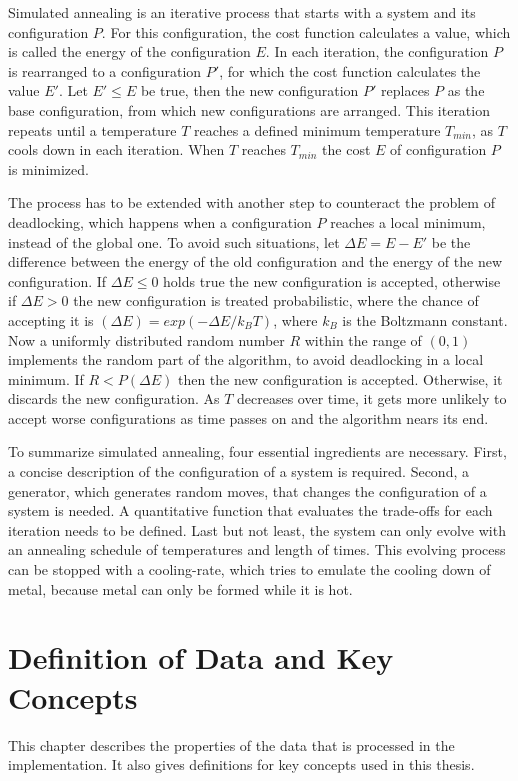 \documentclass[draft,final]{vutinfth} %
\begin{document}
Simulated annealing is an iterative process that starts with a system and its configuration $P$. For this configuration, the cost function calculates a value, which is called the energy of the configuration $E$. In each iteration, the configuration $P$ is rearranged to a configuration $P'$, for which the cost function calculates the value $E'$. Let $E' \leq E$ be true, then the new configuration $P'$ replaces $P$ as the base configuration, from which new configurations are arranged. This iteration repeats until a temperature $T$ reaches a defined minimum temperature $T_{min}$, as $T$ cools down in each iteration. When $T$ reaches $T_{min}$ the cost $E$ of configuration $P$ is minimized.

The process has to be extended with another step to counteract the problem of deadlocking, which happens when a configuration $P$ reaches a local minimum, instead of the global one. To avoid such situations, let $\Delta E = E - E'$ be the difference between the energy of the old configuration and the energy of the new configuration. If $\Delta E \leq 0$ holds true the new configuration is accepted, otherwise if $\Delta E > 0$ the new configuration is treated probabilistic, where the chance of accepting it is $(\Delta E) = exp(-\Delta E / k_B T)$, where $k_B$ is the Boltzmann constant. Now a uniformly distributed random number $R$ within the range of $(0,1)$ implements the random part of the algorithm, to avoid deadlocking in a local minimum. If $R < P(\Delta E)$ then the new configuration is accepted. Otherwise, it discards the new configuration. As $T$ decreases over time, it gets more unlikely to accept worse configurations as time passes on and the algorithm nears its end.

To summarize simulated annealing, four essential ingredients are necessary. First, a concise description of the configuration of a system is required. Second, a generator, which generates random moves, that changes the configuration of a system is needed. A quantitative function that evaluates the trade-offs for each iteration needs to be defined. Last but not least, the system can only evolve with an annealing schedule of temperatures and length of times. This evolving process can be stopped with a cooling-rate, which tries to emulate the cooling down of metal, because metal can only be formed while it is hot.


\chapter{Definition of Data and Key Concepts}
\label{chap:definitions}
This chapter describes the properties of the data that is processed in the implementation. It also gives definitions for key concepts used in this thesis.
\end{document}
